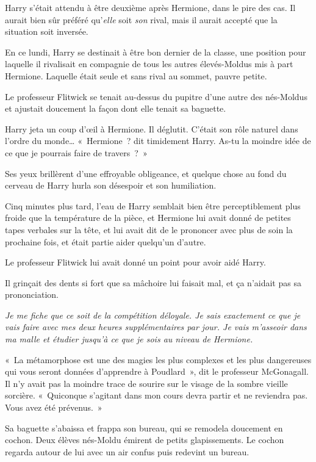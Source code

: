 Harry s'était attendu à être deuxième après Hermione, dans le pire des cas. Il aurait bien sûr préféré qu'\emph{elle} soit \emph{son} rival, mais il aurait accepté que la situation soit inversée.

En ce lundi, Harry se destinait à être bon dernier de la classe, une position pour laquelle il rivalisait en compagnie de tous les autres élevés-Moldus mis à part Hermione. Laquelle était seule et sans rival au sommet, pauvre petite.

Le professeur Flitwick se tenait au-dessus du pupitre d'une autre des nés-Moldus et ajustait doucement la façon dont elle tenait sa baguette.

Harry jeta un coup d'œil à Hermione. Il déglutit. C'était son rôle naturel dans l'ordre du monde… «~Hermione~? dit timidement Harry. As-tu la moindre idée de ce que je pourrais faire de travers~?~»

Ses yeux brillèrent d'une effroyable obligeance, et quelque chose au fond du cerveau de Harry hurla son désespoir et son humiliation.

Cinq minutes plus tard, l'eau de Harry semblait bien être perceptiblement plus froide que la température de la pièce, et Hermione lui avait donné de petites tapes verbales sur la tête, et lui avait dit de le prononcer avec plus de soin la prochaine fois, et était partie aider quelqu'un d'autre.

Le professeur Flitwick lui avait donné un point pour avoir aidé Harry.

Il grinçait des dents si fort que sa mâchoire lui faisait mal, et ça n'aidait pas sa prononciation.

\emph{Je me fiche que ce soit de la compétition déloyale. Je sais exactement ce que je vais faire avec mes deux heures supplémentaires par jour. Je vais m'asseoir dans ma malle et étudier jusqu'à ce que je sois au niveau de Hermione.}

\later

«~La métamorphose est une des magies les plus complexes et les plus dangereuses qui vous seront données d'apprendre à Poudlard~», dit le professeur McGonagall. Il n'y avait pas la moindre trace de sourire sur le visage de la sombre vieille sorcière. «~Quiconque s'agitant dans mon cours devra partir et ne reviendra pas. Vous avez été prévenus.~»

Sa baguette s'abaissa et frappa son bureau, qui se remodela doucement en cochon. Deux élèves nés-Moldu émirent de petits glapissements. Le cochon regarda autour de lui avec un air confus puis redevint un bureau.


